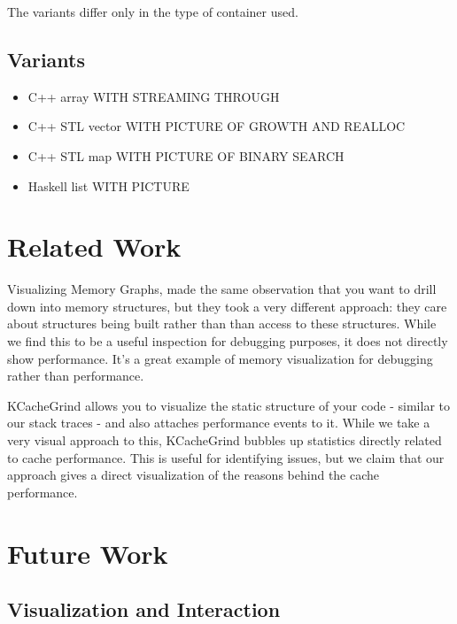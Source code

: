 \documentclass[annual]{acmsiggraph}
\begin{document}
    The variants differ only in the type of container used.

  \subsection{Variants}
    \begin{itemize}
      \item C++ array WITH STREAMING THROUGH
      \item C++ STL vector WITH PICTURE OF GROWTH AND REALLOC
      \item C++ STL map WITH PICTURE OF BINARY SEARCH
      \item Haskell list WITH PICTURE
    \end{itemize}

\section{Related Work}

Visualizing Memory Graphs\cite{zimmerman:2001:VMG}, made the same observation that you want to drill down into memory structures, but they took a very different approach: they care about structures being built rather than than access to these structures. While we find this to be a useful inspection for debugging purposes, it does not directly show performance. It's a great example of memory visualization for debugging rather than performance.

KCacheGrind allows you to visualize the static structure of your code - similar to our stack traces - and also attaches performance events to it. While we take a very visual approach to this, KCacheGrind bubbles up statistics directly related to cache performance. This is useful for identifying issues, but we claim that our approach gives a direct visualization of the reasons behind the cache performance.

\section{Future Work}
  \subsection{Visualization and Interaction}
\end{document}
